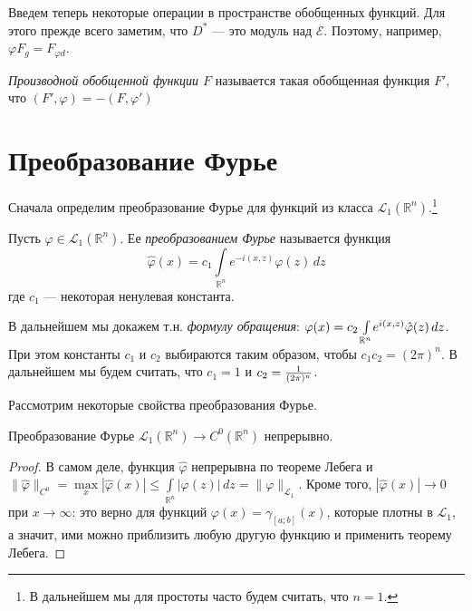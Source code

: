 \documentclass[10pt]{article}
\newcommand*{\p}[1]{#1\nobreak\discretionary{}{\hbox{$\mathsurround=0pt #1$}}{}}
\begin{document}
Введем теперь некоторые операции в пространстве обобщенных
фун\-кций. Для этого прежде всего заметим, что $D^*$ --- это модуль
над $\mathcal{E}$. Поэтому, например, $\varphi F_g=F_{\varphi d}$.

\begin{df}
\emph{Производной обобщенной функции $F$} называется такая
обобщенная функция $F'$, что $(F',\varphi)=-(F,\varphi')$
\end{df}


\section{Преобразование Фурье}

Сначала определим преобразование Фурье для функций из класса
$\mathcal{L}_1(\mathbb{R}^n)$.\footnote{В дальнейшем мы для простоты
часто будем считать, что $n=1$.}

\begin{df}
Пусть $\varphi\in\mathcal{L}_1(\mathbb{R}^n)$. Ее
\emph{преобразованием Фурье} называется функция
$$\hat{\varphi}(x)=c_1\int\limits_{\mathbb{R}^n}\!e^{-i(x,z)}\varphi(z)\,dz$$
где $c_1$ --- некоторая ненулевая константа.
\end{df}

\begin{note}
В дальнейшем мы докажем т.н. \emph{формулу обращения}:
$\varphi(x)\p=c_2\int\limits_{\mathbb{R}^n}\!e^{i(x,z)}\hat{\varphi}(z)\,dz$.
При этом константы $c_1$ и $c_2$ выбираются таким образом, чтобы
$c_1c_2=(2\pi)^n$. В дальнейшем мы будем считать, что $c_1=1$ и
$c_2\p=\frac{1}{(2\pi)^n}$.
\end{note}

Рассмотрим некоторые свойства преобразования Фурье.

\begin{theorem}
Преобразование Фурье $\mathcal{L}_1(\mathbb{R}^n)\to
C^0(\mathbb{R}^n)$ непрерывно.
\end{theorem}

\begin{proof}
В самом деле, функция $\hat{\varphi}$ непрерывна по теореме Лебега и
$\|\hat{\varphi}\|_{C^0}=\max\limits_x|\hat{\varphi}(x)|\leqslant\int\limits_
{\mathbb{R}^n}\!|\varphi(z)|\,dz=\|\varphi\|_{\mathcal{L}_1}$. Кроме
того, $|\hat{\varphi}(x)|\to 0$ при $x\to\infty$: это верно для
функций $\varphi(x)=\gamma_{[a;b]}(x)$, которые плотны в
$\mathcal{L}_1$, а значит, ими можно приблизить любую другую функцию
и применить теорему Лебега.
\end{proof}
\end{document}
